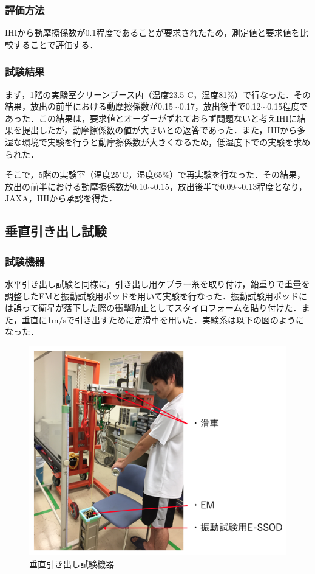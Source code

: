 \subsubsection{評価方法}

IHIから動摩擦係数が0.1程度であることが要求されたため，測定値と要求値を比較することで評価する．

\subsubsection{試験結果}

まず，1階の実験室クリーンブース内（温度23.5$^\circ$C，湿度81$\%$）で行なった．その結果，放出の前半における動摩擦係数が0.15$\sim$0.17，放出後半で0.12$\sim$0.15程度であった．この結果は，要求値とオーダーがずれておらず問題ないと考えIHIに結果を提出したが，動摩擦係数の値が大きいとの返答であった．また，IHIから多湿な環境で実験を行うと動摩擦係数が大きくなるため，低湿度下での実験を求められた．

そこで，5階の実験室（温度25$^\circ$C，湿度65$\%$）で再実験を行なった．その結果，放出の前半における動摩擦係数が0.10$\sim$0.15，放出後半で0.09$\sim$0.13程度となり，JAXA，IHIから承認を得た．

\subsection{垂直引き出し試験}

\subsubsection{試験機器}

水平引き出し試験と同様に，引き出し用ケブラー糸を取り付け，鉛重りで重量を調整したEMと振動試験用ポッドを用いて実験を行なった．振動試験用ポッドには誤って衛星が落下した際の衝撃防止としてスタイロフォームを貼り付けた．また，垂直に1m/sで引き出すために定滑車を用いた．実験系は以下の図のようになった．

\begin{figure}[h]
	\begin{center}
		
		\includegraphics[width=0.6\linewidth]{04/fig/verticalequipment.png}
		\caption{垂直引き出し試験機器}
		\label{fig:verticalequipment}
		
	\end{center}
\end{figure}

